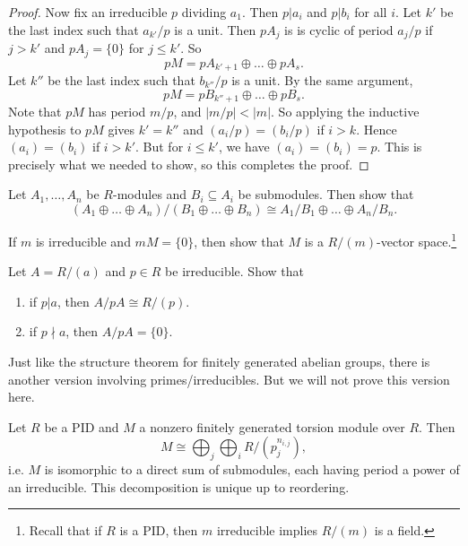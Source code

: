 \begin{proof}
  Now fix an irreducible $p$ dividing $a_1$. Then
  $p | a_i$ and $p | b_i$ for all $i$. Let $k'$ be
  the last index such that $a_{k'} / p$ is a unit.
  Then $pA_j$ is is cyclic of period $a_j / p$ if
  $j > k'$ and $pA_j = \{0\}$ for $j \le k'$. So
  \[
    pM = pA_{k' + 1} \oplus \dots \oplus pA_s.
  \]
  Let $k''$ be the last index such that
  $b_{k''} / p$ is a unit. By the same argument,
  \[
  pM = pB_{k'' + 1} \oplus \dots \oplus pB_s
  .\]
  Note that $pM$ has period $m / p$, and
  $|m / p| < |m|$. So applying the inductive hypothesis
  to $pM$ gives $k' = k''$ and $(a_i / p) = (b_i / p)$
  if $i > k$. Hence $(a_i) = (b_i)$ if $i > k'$.
  But for $i \le k'$, we have $(a_i) = (b_i) = p$.
  This is precisely what we needed to show, so this
  completes the proof.
\end{proof}

\begin{exercise}
  \label{ex:quotient-submodule-iso}
  Let $A_1, \dots, A_n$ be $R$-modules and
  $B_i \subseteq A_i$ be submodules. Then show that
  \[
    (A_1 \oplus \dots \oplus A_n)
    / (B_1 \oplus \dots \oplus B_n)
    \cong A_1 / B_1 \oplus \dots \oplus A_n / B_n.
  \]
\end{exercise}

\begin{exercise}
  \label{ex:irreducible-vec}
  If $m$ is irreducible and $mM = \{0\}$, then show that
  $M$ is a $R / (m)$-vector space.\footnote{Recall that if $R$ is a PID, then $m$ irreducible implies $R / (m)$ is a field.}
\end{exercise}

\begin{exercise}
  \label{ex:quotient-irreducible}
  Let $A = R / (a)$ and $p \in R$ be irreducible. Show that
  \begin{enumerate}
    \item if $p | a$, then $A / pA \cong R / (p)$.
    \item if $p {\nmid} a$, then $A / pA = \{0\}$.
  \end{enumerate}
\end{exercise}

\begin{remark}
  Just like the structure theorem for finitely
  generated abelian groups, there is another version
  involving primes/irreducibles. But we will not prove
  this version here.
\end{remark}

\begin{theorem}
  Let $R$ be a PID and $M$ a nonzero finitely
  generated torsion module over $R$. Then
  \[
    M \cong \bigoplus_j \bigoplus_i R / (p_j^{n_{i, j}}),
  \]
  i.e. $M$ is isomorphic to a direct sum of submodules,
  each having period a power of an irreducible. This
  decomposition is unique up to reordering.
\end{theorem}


